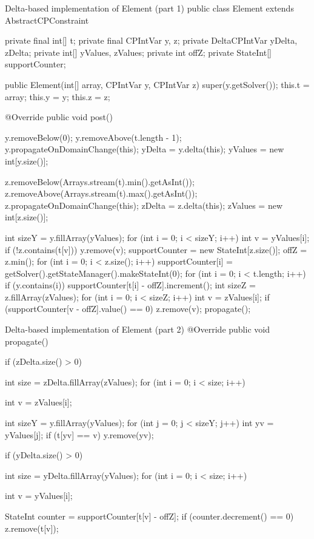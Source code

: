 \documentclass[11pt, a4paper]{scrartcl}
\begin{document}
\begin{codebox}[label={lst:element-delta-1}]{Delta-based implementation of Element (part 1)}
public class Element extends AbstractCPConstraint {

    private final int[] t;
    private final CPIntVar y, z;
    private DeltaCPIntVar yDelta, zDelta;
    private int[] yValues, zValues;
    private int offZ;
    private StateInt[] supportCounter;

    public Element(int[] array, CPIntVar y, CPIntVar z) {
        super(y.getSolver());
        this.t = array;
        this.y = y;
        this.z = z;
    }

    @Override
    public void post() {
        y.removeBelow(0);
        y.removeAbove(t.length - 1);
        y.propagateOnDomainChange(this);
        yDelta = y.delta(this);
        yValues = new int[y.size()];

        z.removeBelow(Arrays.stream(t).min().getAsInt());
        z.removeAbove(Arrays.stream(t).max().getAsInt());
        z.propagateOnDomainChange(this);
        zDelta = z.delta(this);
        zValues = new int[z.size()];

        int sizeY = y.fillArray(yValues);
        for (int i = 0; i < sizeY; i++) {
            int v = yValues[i];
            if (!z.contains(t[v])) {
                y.remove(v);
            }
        }
        supportCounter = new StateInt[z.size()];
        offZ = z.min();
        for (int i = 0; i < z.size(); i++) {
            supportCounter[i] =
            getSolver().getStateManager().makeStateInt(0);
        }
        for (int i = 0; i < t.length; i++) {
            if (y.contains(i)) {
                supportCounter[t[i] - offZ].increment();
            }
        }
        int sizeZ = z.fillArray(zValues);
        for (int i = 0; i < sizeZ; i++) {
            int v = zValues[i];
            if (supportCounter[v - offZ].value() == 0) {
                z.remove(v);
            }
        }
        propagate();
    }
}
\end{codebox}

\begin{codebox}[label={lst:element-delta-2}]{Delta-based implementation of Element (part 2)}
@Override
public void propagate() {

    if (zDelta.size() > 0) {
        int size = zDelta.fillArray(zValues);
        for (int i = 0; i < size; i++) {
            int v = zValues[i];

            int sizeY = y.fillArray(yValues);
            for (int j = 0; j < sizeY; j++) {
                int yv = yValues[j];
                if (t[yv] == v) {
                    y.remove(yv);
                }
            }
        }
    }

    if (yDelta.size() > 0) {
        int size = yDelta.fillArray(yValues);
        for (int i = 0; i < size; i++) {
            int v = yValues[i];

            StateInt counter = supportCounter[t[v] - offZ];
            if (counter.decrement() == 0) {
                z.remove(t[v]);
            }
        }
    }
}
\end{codebox}
\end{document}

